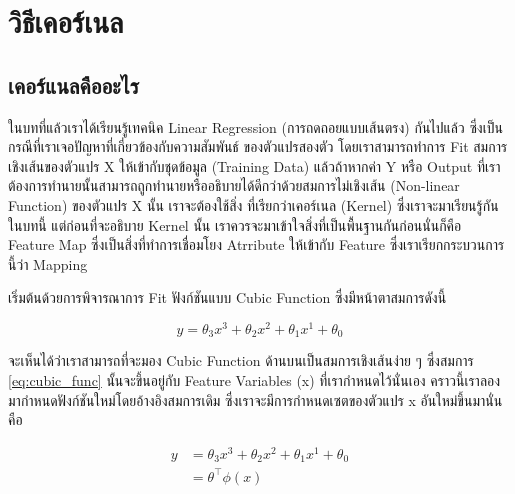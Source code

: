 

\chapter{วิธีเคอร์เนล}
\label{ch:kernel}

\section{เคอร์แนลคืออะไร}

ในบทที่แล้วเราได้เรียนรู้เทคนิค Linear Regression (การถดถอยแบบเส้นตรง) กันไปแล้ว ซึ่งเป็นกรณีที่เราเจอปัญหาที่เกี่ยวข้องกับความสัมพันธ์%
ของตัวแปรสองตัว โดยเราสามารถทำการ Fit สมการเชิงเส้นของตัวแปร X ให้เข้ากับชุดข้อมูล (Training Data) แล้วถ้าหากค่า Y หรือ Output 
ที่เราต้องการทำนายนั้นสามารถถูกทำนายหรืออธิบายได้ดีกว่าด้วยสมการไม่เชิงเส้น (Non-linear Function) ของตัวแปร X นั้น เราจะต้องใช้สิ่ง%
ที่เรียกว่าเคอร์เนล (Kernel) ซึ่งเราจะมาเรียนรู้กันในบทนี้ แต่ก่อนที่จะอธิบาย Kernel นั้น เราควรจะมาเข้าใจสิ่งที่เป็นพื้นฐานกันก่อนนั่นก็คือ 
Feature Map ซึ่งเป็นสิ่งที่ทำการเชื่อมโยง Atrribute ให้เข้ากับ Feature ซึ่งเราเรียกกระบวนการนี้ว่า Mapping 

เริ่มต้นด้วยการพิจารณาการ Fit ฟังก์ชันแบบ Cubic Function ซึ่งมีหน้าตาสมการดังนี้

\begin{equation}\label{eq:cubic_func}
    y = \theta_{3}x^{3} + \theta_{2}x^{2} + \theta_{1}x^{1} + \theta_{0}
\end{equation}

จะเห็นได้ว่าเราสามารถที่จะมอง Cubic Function ด้านบนเป็นสมการเชิงเส้นง่าย ๆ ซึ่งสมการ \ref{eq:cubic_func} นั้นจะขึ้นอยู่กับ Feature 
Variables (x) ที่เรากำหนดไว้นั่นเอง คราวนี้เราลองมากำหนดฟังก์ชันใหม่โดยอ้างอิงสมการเดิม ซึ่งเราจะมีการกำหนดเซตของตัวแปร x อันใหม่ขึ้นมานั่นคือ

\begin{align}\label{eq:cubic_func_2}
    y &= \theta_{3}x^{3} + \theta_{2}x^{2} + \theta_{1}x^{1} + \theta_{0} \nonumber \\ 
      &= \theta^{\top}\phi(x)
\end{align}

